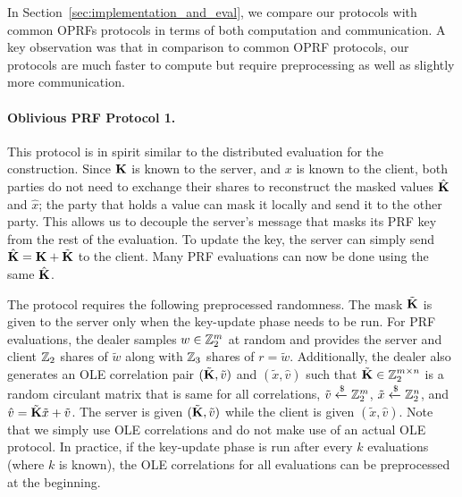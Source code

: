 In Section~\ref{sec:implementation_and_eval}, we compare our protocols with common OPRFs protocols in terms of both computation and communication. A key observation was that in comparison to common OPRF protocols, our protocols are much faster to compute but require preprocessing as well as slightly more communication.


\paragraph{Oblivious PRF Protocol 1.}
This protocol is in spirit similar to the distributed evaluation for the \ttwPRF construction. Since $\mat{K}$ is known to the server, and $x$ is known to the client, both parties do not need to exchange their shares to reconstruct the masked values $\hat{\mat{K}}$ and $\hat{x}$; the party that holds a value can mask it locally and send it to the other party. This allows us to decouple the server's message that masks its PRF key from the rest of the evaluation. To update the key, the server can simply send $\hat{\mat{K}} = \mat{K} + \tilde{\mat{K}}$ to the client. Many PRF evaluations can now be done using the same $\hat{\mat{K}}$.

The protocol requires the following preprocessed randomness. The mask $\tilde{\mat{K}}$ is given to the server only when the key-update phase needs to be run. For PRF evaluations, the dealer samples $w \in \mathbb{Z}_2^m$ at random and provides the server and client $\mathbb{Z}_2$ shares of $\tilde{w}$ along with $\mathbb{Z}_3$ shares of $r = \tilde{w}$. Additionally, the dealer also generates an OLE correlation pair $(\tilde{\mat{K}}, \tilde{v})$ and $(\tilde{x}, \hat{v})$ such that $\tilde{\mat{K}} \in \Z_2^{m \times n}$ is a random circulant matrix that is same for all correlations, $\tilde{v} \xleftarrow{\$} \mathbb{Z}_2^m$, $\tilde{x} \xleftarrow{\$} \mathbb{Z}_2^n$, and $\hat{v} = \tilde{\mat{K}}\tilde{x} + \tilde{v}$. The server is given $(\tilde{\mat{K}}, \tilde{v})$ while the client is given $(\tilde{x}, \hat{v})$. Note that we simply use OLE correlations and do not make use of an actual OLE protocol. In practice, if the key-update phase is run after every $k$ evaluations (where $k$ is known), the OLE correlations for all evaluations can be preprocessed at the beginning.  \\

